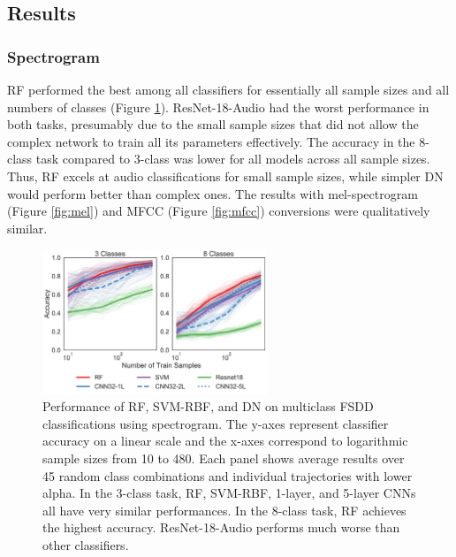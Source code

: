 \subsection{Results}
\subsubsection{Spectrogram}
RF performed the best among all classifiers for essentially all sample sizes and all numbers of classes (Figure \ref{fig:spoken_digit}). ResNet-18-Audio had the worst performance in both tasks, presumably due to the small sample sizes that did not allow the complex network to train all its parameters effectively.
The accuracy in the 8-class task compared to 3-class was lower for all models across all sample sizes. Thus, RF excels at audio classifications for small sample sizes, while simpler DN would perform better than complex ones.
The results with mel-spectrogram (Figure \ref{fig:mel}) and MFCC (Figure \ref{fig:mfcc}) conversions were qualitatively similar.

\begin{figure}[!htb]
\centering
\includegraphics[width=0.6\textwidth]{figures/spoken.pdf}
  \caption{Performance of RF, SVM-RBF, and DN on multiclass FSDD classifications using spectrogram. 
  The y-axes represent classifier accuracy on a linear scale and the x-axes correspond to logarithmic sample sizes from 10 to 480. Each panel shows average results over 45 random class combinations and individual trajectories with lower alpha.
  In the 3-class task, RF, SVM-RBF, 1-layer, and 5-layer CNNs all have very similar performances. In the 8-class task, RF achieves the highest accuracy. ResNet-18-Audio performs much worse than other classifiers.
  }
\label{fig:spoken_digit}
\end{figure}
\vfil\eject

